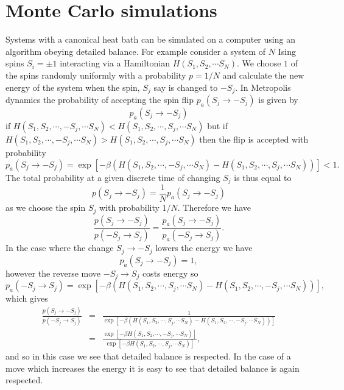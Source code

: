 \documentclass[11pt]{report}
\begin{document}
\section{Monte Carlo simulations}
Systems with a canonical heat bath can be simulated on a computer using an algorithm
obeying detailed balance. For example consider a system of $N$ Ising spins $S_i=\pm1$ interacting via a Hamiltonian $H(S_1, S_2,\cdots S_N)$. We choose $1$ of the spins randomly uniformly with a probability $p=1/N$ and calculate the new energy of the system when the spin, $S_j$ say is changed to $-S_j$. In Metropolis dynamics the probability of accepting the spin flip $p_a(S_j\to -S_j)$ is given by 
\begin{equation}
p_a(S_j\to -S_j)
\end{equation}
if $H(S_1, S_2,\cdots, -S_j,\cdots S_N) < H(S_1, S_2,\cdots, S_j,\cdots S_N)$ but if $H(S_1, S_2,\cdots, -S_j,\cdots S_N) > H(S_1, S_2,\cdots, S_j,\cdots S_N)$ then the flip is accepted with probability 
\begin{equation}
p_a(S_j\to -S_j) = \exp\left[ -\beta\left(H(S_1, S_2,\cdots, -S_j,\cdots S_N) - H(S_1, S_2,\cdots, S_j,\cdots S_N)\right)\right] <1.
\end{equation}
The total probability at a given discrete time of changing $S_j$ is thus equal to 
\begin{equation}
p(S_j\to -S_j) = \frac{1}{N} p_a(S_j\to -S_j)
\end{equation}
as we choose the spin $S_j$ with probability $1/N$. Therefore we have
\begin{equation}
\frac{p(S_j\to -S_j)}{p(-S_j\to S_j)} = \frac{p_a(S_j\to -S_j)}{p_a(-S_j\to S_j)}.
\end{equation}
In the case where the change $S_j\to -S_j$ lowers the energy we have
\begin{equation}
p_a(S_j\to -S_j) =1,
\end{equation}
however the reverse move $-S_j\to S_j$ costs energy so 
\begin{equation}
p_a(-S_j\to S_j) =\exp\left[ -\beta\left(H(S_1, S_2,\cdots, S_j,\cdots S_N) - H(S_1, S_2,\cdots, -S_j,\cdots S_N)\right)\right],
\end{equation}
which gives
\begin{eqnarray}
\frac{p(S_j\to -S_j)}{p(-S_j\to S_j)} &=& \frac{1}{\exp\left[ -\beta\left(H(S_1, S_2,\cdots, S_j,\cdots S_N) - H(S_1, S_2,\cdots, -S_j,\cdots S_N)\right)\right]} \nonumber \\
&=&\frac{ \exp\left[ -\beta H(S_1, S_2,\cdots, -S_j,\cdots S_N)\right]}{\exp\left[ -\beta H(S_1, S_2,\cdots, S_j,\cdots S_N)\right]},
\end{eqnarray}
and so in this case we see that detailed balance is respected. In the case of a move which increases the energy it is easy to see that detailed balance is again respected.  
\end{document}
